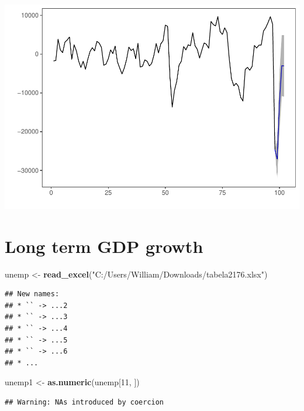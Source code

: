 \documentclass[
]{article}
\newenvironment{Shaded}{\begin{snugshade}}{\end{snugshade}}
\newcommand{\DecValTok}[1]{\textcolor[rgb]{0.00,0.00,0.81}{#1}}
\newcommand{\KeywordTok}[1]{\textcolor[rgb]{0.13,0.29,0.53}{\textbf{#1}}}
\newcommand{\NormalTok}[1]{#1}
\newcommand{\StringTok}[1]{\textcolor[rgb]{0.31,0.60,0.02}{#1}}
\begin{document}
\begin{center}\includegraphics{Econo2_P5_files/figure-latex/forecast plot-1} \end{center}

\section{Long term GDP growth}

\begin{Shaded}
\begin{Highlighting}[]
\NormalTok{unemp <-}\StringTok{ }\KeywordTok{read_excel}\NormalTok{(}\StringTok{"C:/Users/William/Downloads/tabela2176.xlsx"}\NormalTok{)}
\end{Highlighting}
\end{Shaded}

\begin{verbatim}
## New names:
## * `` -> ...2
## * `` -> ...3
## * `` -> ...4
## * `` -> ...5
## * `` -> ...6
## * ...
\end{verbatim}

\begin{Shaded}
\begin{Highlighting}[]
\NormalTok{unemp1 <-}\StringTok{ }\KeywordTok{as.numeric}\NormalTok{(unemp[}\DecValTok{11}\NormalTok{, ])}
\end{Highlighting}
\end{Shaded}

\begin{verbatim}
## Warning: NAs introduced by coercion
\end{verbatim}
\end{document}
